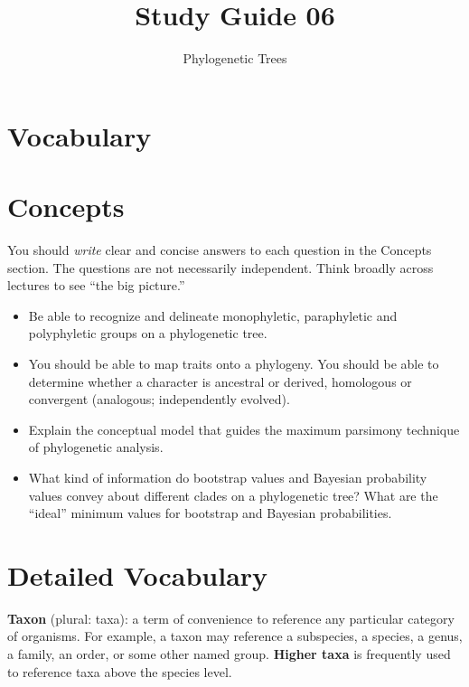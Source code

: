 \documentclass[letterpaper]{tufte-handout}
\title{Study Guide 06\hfill}
\author{Phylogenetic Trees}
\date{} %
\begin{document}
\maketitle	%


\section{Vocabulary} 

\section{Concepts}

You should \emph{write} clear and concise answers to each question in the Concepts section.  The questions are not necessarily independent.  Think broadly across lectures to see ``the big picture.'' 

\begin{itemize}
	\item Be able to recognize and delineate monophyletic, paraphyletic and polyphyletic groups on a phylogenetic tree.

	\item You should be able to map traits onto a phylogeny. You should be able to determine whether a character is ancestral or derived, homologous or convergent (analogous; independently evolved).

	\item Explain the conceptual model that guides the maximum parsimony technique of phylogenetic analysis.

	\item What kind of information do bootstrap values and Bayesian probability values convey about different clades on a phylogenetic tree?  What are the ``ideal'' minimum values for bootstrap and Bayesian probabilities.

\end{itemize}

\section{Detailed Vocabulary}

\textbf{Taxon} (plural: taxa): a term of convenience to reference any particular category of organisms. For example, a taxon may reference a subspecies, a species, a genus, a family, an order, or some other named group. \textbf{Higher taxa} is frequently used to reference taxa above the species level.
\end{document}
